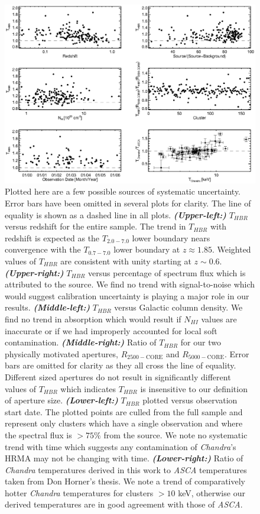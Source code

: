 \documentclass[12pt,preprint]{aastex}
\begin{document}
\begin{figure}
\begin{center}
\includegraphics*[width=\textwidth, trim=0mm 0mm 0mm 0mm, clip]{f4.eps}
\caption{
Plotted here are a few possible sources of systematic uncertainty.
Error bars have been omitted in several plots for clarity. The line of
equality is shown as a dashed line in all
plots. {\bfseries\em{(Upper-left:)}} $T_{HBR}$ versus redshift for the
entire sample. The trend in $T_{HBR}$ with redshift is expected as the
$T_{2.0-7.0}$ lower boundary nears convergence with the $T_{0.7-7.0}$
lower boundary at $z \approx 1.85$. Weighted values of $T_{HBR}$ are
consistent with unity starting at $z \sim
0.6$. {\bfseries\em{(Upper-right:)}} $T_{HBR}$ versus percentage of
spectrum flux which is attributed to the source. We find no trend with
signal-to-noise which would suggest calibration uncertainty is playing
a major role in our results. {\bfseries\em{(Middle-left:)}} $T_{HBR}$
versus Galactic column density. We find no trend in absorption which
would result if $N_{HI}$ values are inaccurate or if we had improperly
accounted for local soft
contamination. {\bfseries\em{(Middle-right:)}} Ratio of $T_{HBR}$ for
our two physically motivated apertures, $R_{2500-\mathrm{CORE}}$ and
$R_{5000-\mathrm{CORE}}$. Error bars are omitted for clarity as they all
cross the line of equality. Different sized apertures do not result in
significantly different values of $T_{HBR}$ which indicates $T_{HBR}$
is insensitive to our definition of aperture
size. {\bfseries\em{(Lower-left:)}} $T_{HBR}$ plotted versus
observation start date. The plotted points are culled from the full
sample and represent only clusters which have a single observation and
where the spectral flux is $> 75\%$ from the source. We note no
systematic trend with time which suggests any contamination of {\it
Chandra}'s HRMA may not be changing with
time. {\bfseries\em{(Lower-right:)}} Ratio of {\it Chandra}
temperatures derived in this work to {\it ASCA} temperatures taken
from Don Horner's thesis. We note a trend of comparatively hotter {\it
Chandra} temperatures for clusters $> 10$ keV, otherwise our derived
temperatures are in good agreement with those of {\it ASCA}.
}
\label{fig:sys}
\end{center}
\end{figure}
\end{document}
